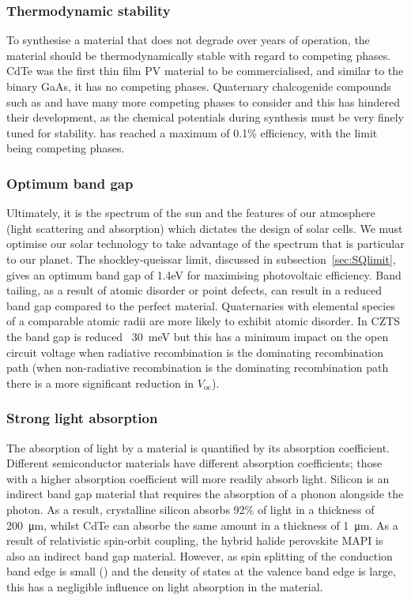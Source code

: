 \subsubsection{Thermodynamic stability}
To synthesise a material that does not degrade over years of operation, the material should be thermodynamically stable with regard to competing phases. CdTe was the first thin film PV material to be commercialised, and similar to the binary GaAs, it has no competing phases. Quaternary chalcogenide compounds such as  and  have many more competing phases to consider and this has hindered their development, as the chemical potentials during synthesis must be very finely tuned for stability.  has reached a maximum of 0.1\% efficiency, with the limit being competing phases.

\subsubsection{Optimum band gap}
Ultimately, it is the spectrum of the sun and the features of our atmosphere (light scattering and absorption) which dictates the design of solar cells. We must optimise our solar technology to take advantage of the spectrum that is particular to our planet. The shockley-queissar limit, discussed in subsection\ \ref{sec:SQlimit}, gives an optimum band gap of 1.4eV for maximising photovoltaic efficiency.\autocite{Ruhle2016}
Band tailing, as a result of atomic disorder or point defects, can result in a reduced band gap compared to the perfect material. Quaternaries with elemental species of a comparable atomic radii are more likely to exhibit atomic disorder. In CZTS the band gap is reduced ~\SI{30}{meV} but this has a minimum impact on the open circuit voltage when radiative recombination is the dominating recombination path (when non-radiative recombination is the dominating recombination path there is a more significant reduction in $V_\textrm{oc}$).\autocite{Rey2018}

\subsubsection{Strong light absorption}
The absorption of light by a material is quantified by its absorption coefficient. Different semiconductor materials have different absorption coefficients; those with a higher absorption coefficient will more readily absorb light. Silicon is an indirect band gap material that requires the absorption of a phonon alongside the photon. As a result, crystalline silicon absorbs 92\% of light in a thickness of  \SI{200}{\micro\metre}, whilst CdTe can absorbe the same amount in a thickness of \SI{1}{\micro\metre}.\autocite{Poortmans2006} As a result of relativistic spin-orbit coupling, the hybrid halide perovskite MAPI is also an indirect band gap material. However, as spin splitting of the conduction band edge is small () and the density of states at the valence band edge is large, this has a negligible influence on light absorption in the material.\autocite{Azarhoosh2016}

